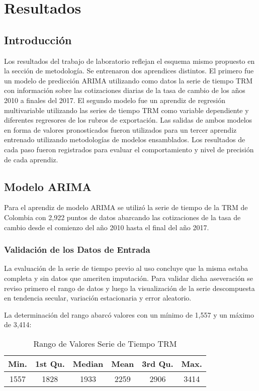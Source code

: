 \setcounter{chapter}{3}
\chapter{Resultados}
\section{Introducción}
Los resultados del trabajo de laboratorio reflejan el esquema mismo propuesto en la sección de metodología. Se entrenaron dos aprendices distintos. El primero fue un modelo de predicción ARIMA utilizando como datos la serie de tiempo TRM con información sobre las cotizaciones diarias de la tasa de cambio de los años 2010 a finales del 2017. El segundo modelo fue un aprendiz de regresión multivariable utilizando las series de tiempo TRM como variable dependiente y diferentes regresores de los rubros de exportación. Las salidas de ambos modelos en forma de valores pronosticados fueron utilizados para un tercer aprendiz entrenado utilizando metodologías de modelos ensamblados. Los resultados de cada paso fueron registrados para evaluar el comportamiento y nivel de precisión de cada aprendiz.

\section{Modelo ARIMA}
Para el aprendiz de modelo ARIMA se utilizó la serie de tiempo de la TRM de Colombia con 2,922 puntos de datos abarcando las cotizaciones de la tasa de cambio desde el comienzo del año 2010 hasta el final del año 2017.

\subsection{Validación de los Datos de Entrada}
La evaluación de la serie de tiempo previo al uso concluye que la misma estaba completa y sin datos que ameriten imputación. Para validar dicha aseveración se reviso primero el rango de datos y luego la visualización de la serie descompuesta en tendencia secular, variación estacionaria y error aleatorio.

La determinación del rango abarcó valores con un mínimo de 1,557 y un máximo de 3,414:

\begin{table}[h!]
  \begin{center}
    \caption{Rango de Valores Serie de Tiempo TRM}
    \label{tab:table1}
    \begin{tabular}{c|c|c|c|c|c}
      \textbf{Min.} & \textbf{1st Qu.} & \textbf{Median} & \textbf{Mean} & \textbf{3rd Qu.} & \textbf{Max.}\\
      \hline
      1557 & 1828 & 1933 & 2259 & 2906 & 3414\\
    \end{tabular}
  \end{center}
\end{table}

